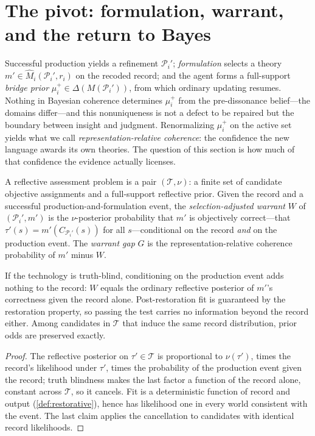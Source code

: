 \section{The pivot: formulation, warrant, and the return to Bayes}
\label{sec:pivot}

Successful production yields a refinement $\mathcal P_i'$; \emph{formulation}
selects a theory $m'\in\widehat M_i(\mathcal P_i',r_i)$ on the recoded
record; and the agent forms a full-support \emph{bridge prior}
$\mu_i^{+}\in\Delta(M(\mathcal P_i'))$, from which ordinary updating
resumes.  Nothing in Bayesian coherence determines $\mu_i^{+}$ from the
pre-dissonance belief---the domains differ---and this nonuniqueness is not a
defect to be repaired but the boundary between insight and judgment.
Renormalizing $\mu_i^{+}$ on the active set yields what we call
\emph{representation-relative coherence}: the confidence the new language
awards its own theories.  The question of this section is how much of that
confidence the evidence actually licenses.

\begin{definition}
\label{def:warrant}
A reflective assessment problem is a pair $(\mathcal T,\nu)$: a finite set
of candidate objective assignments and a full-support reflective prior.
Given the record and a successful production-and-formulation event, the
\emph{selection-adjusted warrant} $W$ of $(\mathcal P_i',m')$ is the
$\nu$-posterior probability that $m'$ is objectively correct---that
$\tau'(s)=m'(C_{\mathcal P_i'}(s))$ for all $s$---conditional on the record
\emph{and} on the production event.  The \emph{warrant gap} $G$ is the
representation-relative coherence probability of $m'$ minus $W$.
\end{definition}

\begin{theorem}
\label{thm:uninformative}
If the technology is truth-blind, conditioning on the production event adds
nothing to the record: $W$ equals the ordinary reflective posterior of
$m'$'s correctness given the record alone.  Post-restoration fit is
guaranteed by the restoration property, so passing the test carries no
information beyond the record either.  Among candidates in $\mathcal T$ that
induce the same record distribution, prior odds are preserved exactly.
\end{theorem}

\begin{proof}
The reflective posterior on $\tau'\in\mathcal T$ is proportional to
$\nu(\tau')$, times the record's likelihood under $\tau'$, times the
probability of the production event given the record; truth blindness makes
the last factor a function of the record alone, constant across
$\mathcal T$, so it cancels.  Fit is a deterministic function of record and
output (\cref{def:restorative}), hence has likelihood one in every world
consistent with the event.  The last claim applies the cancellation to
candidates with identical record likelihoods.
\end{proof}

